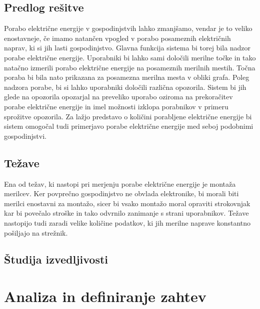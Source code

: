 \documentclass[12pt,a4paper,titlepage,openany]{report}
\begin{document}
\section{Predlog rešitve}
\thispagestyle{fancy}


Porabo električne energije v gospodinjstvih lahko zmanjšamo, vendar je to veliko enostavneje, če imamo natančen vpogled v porabo posameznih električnih naprav, ki si jih lasti gospodinjstvo. Glavna funkcija sistema bi torej bila nadzor porabe električne energije. Uporabniki bi lahko sami določili merilne točke in tako natačno izmerili porabo električne energije na posameznih merilnih mestih. Točna poraba bi bila nato prikazana za posamezna merilna mesta v obliki grafa. Poleg nadzora porabe, bi si lahko uporabniki določili različna opozorila. Sistem bi jih glede na opozorila opozarjal na preveliko uporabo oziroma na prekoračitev porabe električne energije in imel možnosti izklopa porabnikov v primeru sprožitve opozorila. Za lažjo predstavo o količini porabljene električne energije bi sistem omogočal tudi primerjavo porabe električne energije med seboj podobnimi gospodinjstvi.

\section{Težave}
\thispagestyle{fancy}

Ena od težav, ki nastopi pri merjenju porabe električne energije je montaža merilcev. Ker povprečno gospodinjstvo ne obvlada elektronike, bi morali biti merilci enostavni za montažo, sicer bi vsako montažo moral opraviti strokovnjak kar bi povečalo stroške in tako odvrnilo zanimanje s strani uporabnikov. Težave nastopijo tudi zaradi velike količine podatkov, ki jih merilne naprave konstantno pošiljajo na strežnik. 

\section{Študija izvedljivosti}
\thispagestyle{fancy}


\chapter{Analiza in definiranje zahtev}
\thispagestyle{fancy}
\end{document}
